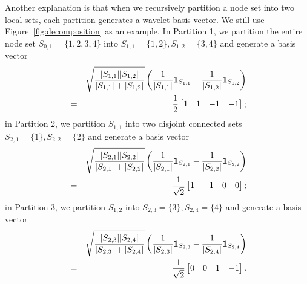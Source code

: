 \documentclass[journal,twocolumn,10pt]{IEEEtran}
\theoremstyle{definition}
\begin{document}
Another explanation is that when we recursively partition a node set into two local sets, each partition generates a wavelet basis vector. We still use Figure~\ref{fig:decomposition} as an example. In Partition 1, we partition the entire node set $S_{0,1} = \{1, 2, 3, 4 \}$ into $S_{1,1} =  \{1, 2 \}, S_{1,2} =  \{3, 4 \}$ and generate a basis vector   
\begin{eqnarray*}
&& \sqrt{ \frac{|S_{1,1}| |S_{1,2}|}{|S_{1,1}|+|S_{1,2}|}} \left(  \frac{1}{|S_{1,1}|} {\bf 1}_{S_{1,1}} - \frac{1}{|S_{1,2}|} {\bf 1}_{S_{1,2}}\right) 
\\
& = & \frac{1}{2}\begin{bmatrix}
1& 1 & -1 & -1
\end{bmatrix};
\end{eqnarray*}
in Partition 2, we partition $S_{1,1}$ into two disjoint connected sets $S_{2,1} =  \{1 \}, S_{2,2} =  \{ 2 \}$ and generate a basis vector   
\begin{eqnarray*}
&& \sqrt{ \frac{|S_{2,1} | |S_{2,2} |}{|S_{2,1} |+|S_{2,2} |}} \left(  \frac{1}{|S_{2,1} |} {\bf 1}_{S_{2,1} } - \frac{1}{|S_{2,2} |} {\bf 1}_{S_{2,2} }\right) 
\\
& = & \frac{1}{\sqrt{2}}\begin{bmatrix}
1& -1 & 0 & 0
\end{bmatrix};
\end{eqnarray*}
in Partition 3, we partition $S_{1,2}$ into $S_{2,3} =  \{3 \}, S_{2,4} =  \{ 4 \}$ and generate a basis vector   
\begin{eqnarray*}
&& \sqrt{ \frac{|S_{2,3}| |S_{2,4}|}{|S_{2,3}|+|S_{2,4}|}} \left(  \frac{1}{|S_{2,3}|} {\bf 1}_{S_{2,3}} - \frac{1}{|S_{2,4}|} {\bf 1}_{S_{2,4}}\right) 
\\
& = & \frac{1}{\sqrt{2}}\begin{bmatrix}
0 & 0 & 1 & -1
\end{bmatrix}.
\end{eqnarray*}
\end{document}
